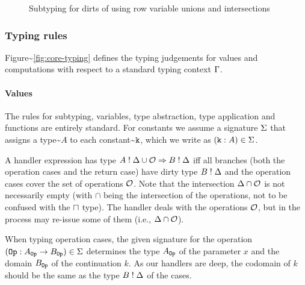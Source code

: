 \documentclass[sigplan,10pt]{acmart}\settopmatter{printfolios=true}
\begin{document}
\begin{figure}[h!]
\begin{center}
{\begin{minipage}{0.95\columnwidth}
\begin{mathpar}

\end{mathpar}
\end{minipage}
}
\end{center}
\caption{Subtyping for dirts of \core using row variable unions and intersections}\label{fig:core-subtyping-dirt2}
\end{figure}

\subsubsection{Typing rules}\label{typing-rules-1}

Figure\textasciitilde{}\ref{fig:core-typing} defines the typing
judgements for values and computations with respect to a standard typing
context \(\ctx\).

\paragraph{Values}

The rules for subtyping, variables, type abstraction, type application
and functions are entirely standard. For constants we assume a signature
\(\sig\) that assigns a type\textasciitilde{}\(A\) to each
constant\textasciitilde{}\(\const\), which we write as
\((\const \T A) \in \sig\).

A handler expression has type \(A \E \dirt \cup \ops \hto B \E \dirt\)
iff all branches (both the operation cases and the return case) have
dirty type \(B \E \dirt\) and the operation cases cover the set of
operations \(\ops\). Note that the intersection \(\dirt \cap \ops\) is
not necessarily empty (with \(\cap\) being the intersection of the
operations, not to be confused with the \(\intersection\) type). The
handler deals with the operations \(\ops\), but in the process may
re-issue some of them (i.e., \(\dirt \cap \ops\)).

When typing operation cases, the given signature for the operation
\((\op \T A_\op \to B_\op) \in \sig\) determines the type \(A_\op\) of
the parameter \(x\) and the domain \(B_\op\) of the continuation \(k\).
As our handlers are deep, the codomain of \(k\) should be the same as
the type \(B \E \dirt\) of the cases.
\end{document}
